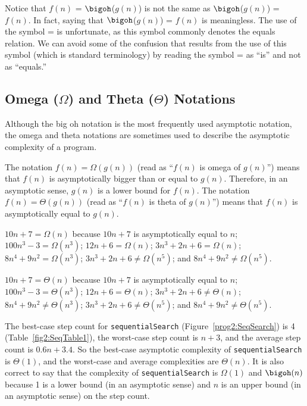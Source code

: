Notice that $f(n)$ = $\bigoh$($g(n)$)
is not the same as $\bigoh$($g(n)$) = $f(n)$.  In fact,
saying that $\bigoh$($g(n)$) = $f(n)$ is meaningless.
The use of the symbol = is unfortunate,
as this symbol commonly denotes the equals relation.
We can avoid some of the confusion that results
from the use of this symbol (which is standard terminology)
by reading the symbol = as ``is'' and not
as ``equals.''

\subsection{Omega ($\Omega$) and Theta ($\Theta$) Notations}
Although
the big oh notation is the most frequently used asymptotic notation,
the omega and theta notations are sometimes used to describe the
asymptotic complexity of a program.

The notation $f(n) = \Omega (g(n))$ (read as ``$f(n)$ is omega of $g(n)$'')
means that $f(n)$ is asymptotically bigger than or equal to $g(n)$.
Therefore, in an asymptotic sense, $g(n)$ is a lower bound
for $f(n)$.
The notation $f(n) = \Theta (g(n))$ (read as ``$f(n)$ is theta of $g(n)$'')
means that $f(n)$ is asymptotically equal to $g(n)$.


\begin{example}
$10n+7 = \Omega (n)$ because $10n+7$ is asymptotically equal to
$n$; $100n^3 - 3 = \Omega (n^3)$; $12n + 6 = \Omega (n)$;
$3n^3+2n+6 = \Omega (n)$; $8n^4 + 9n^2 = \Omega (n^3)$;
$3n^3+2n+6 \neq \Omega (n^5)$; and $8n^4 + 9n^2 \neq \Omega (n^5)$.

$10n+7 = \Theta (n)$ because $10n+7$ is asymptotically equal to
$n$; $100n^3 - 3 = \Theta (n^3)$; $12n + 6 = \Theta (n)$;
$3n^3+2n+6 \neq \Theta (n)$; $8n^4 + 9n^2 \neq \Theta (n^3)$;
$3n^3+2n+6 \neq \Theta (n^5)$; and $8n^4 + 9n^2 \neq \Theta (n^5)$.

The best-case step count for {\tt sequentialSearch}
(Figure~\ref{prog2:SeqSearch}) is 4 (Table~\ref{fig2:SeqTable1}),
the worst-case step count is $n + 3$,
and the average step count is $0.6n + 3.4$.
So the best-case asymptotic complexity of {\tt sequentialSearch} is
$\Theta(1)$, and the worst-case and average complexities are
$\Theta(n)$. It is also correct to say that the complexity of
{\tt sequentialSearch} is $\Omega (1)$ and $\bigoh (n)$
because 1 is a lower bound (in an asymptotic sense) and
$n$ is an upper bound (in an asymptotic sense) on the step count.

\end{example}
 
